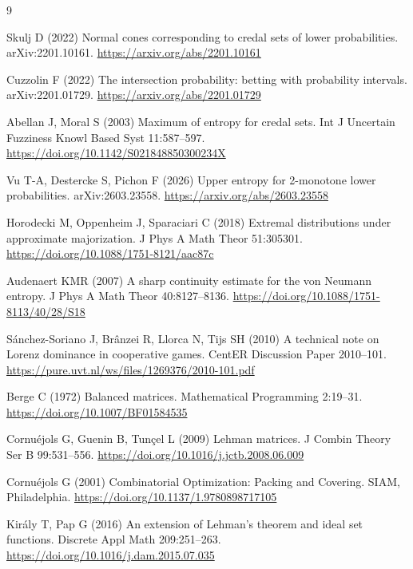 \documentclass[11pt]{article}
\begin{document}
\begin{thebibliography}{9}
\begingroup\raggedright
Skulj D (2022) Normal cones corresponding to credal sets of lower
probabilities. arXiv:2201.10161.
\url{https://arxiv.org/abs/2201.10161}
\par\endgroup

\begingroup\raggedright
Cuzzolin F (2022) The intersection probability: betting with probability
intervals. arXiv:2201.01729.
\url{https://arxiv.org/abs/2201.01729}
\par\endgroup

\begingroup\raggedright
Abellan J, Moral S (2003) Maximum of entropy for credal sets.
Int J Uncertain Fuzziness Knowl Based Syst 11:587--597.
\url{https://doi.org/10.1142/S021848850300234X}
\par\endgroup

\begingroup\raggedright
Vu T-A, Destercke S, Pichon F (2026) Upper entropy for 2-monotone lower
probabilities. arXiv:2603.23558.
\url{https://arxiv.org/abs/2603.23558}
\par\endgroup

\begingroup\raggedright
Horodecki M, Oppenheim J, Sparaciari C (2018) Extremal distributions under
approximate majorization. J Phys A Math Theor 51:305301.
\url{https://doi.org/10.1088/1751-8121/aac87c}
\par\endgroup

\begingroup\raggedright
Audenaert KMR (2007) A sharp continuity estimate for the von Neumann
entropy. J Phys A Math Theor 40:8127--8136.
\url{https://doi.org/10.1088/1751-8113/40/28/S18}
\par\endgroup

\begingroup\raggedright
S\'anchez-Soriano J, Br\^anzei R, Llorca N, Tijs SH (2010) A technical note
on Lorenz dominance in cooperative games. CentER Discussion Paper 2010--101.
\url{https://pure.uvt.nl/ws/files/1269376/2010-101.pdf}
\par\endgroup

Berge C (1972) Balanced matrices. Mathematical Programming 2:19--31.
\url{https://doi.org/10.1007/BF01584535}

Cornu\'ejols G, Guenin B, Tun\c{c}el L (2009) Lehman matrices.
J Combin Theory Ser B 99:531--556.
\url{https://doi.org/10.1016/j.jctb.2008.06.009}

Cornu\'ejols G (2001) Combinatorial Optimization: Packing and Covering.
SIAM, Philadelphia.
\url{https://doi.org/10.1137/1.9780898717105}

Kir\'aly T, Pap G (2016) An extension of Lehman's theorem and ideal set
functions. Discrete Appl Math 209:251--263.
\url{https://doi.org/10.1016/j.dam.2015.07.035}

\end{thebibliography}
\end{document}
